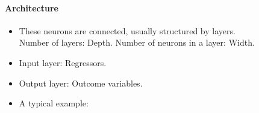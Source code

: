 \documentclass[notes, ignorenonframetext, compress, 10pt, xcolor=svgnames, aspectratio=169]{beamer}
\begin{document}
\begin{frame}{\insertsection}
  \framesubtitle{Architecture}
  \begin{itemize}
\item These neurons are connected, usually structured by layers.\\
Number of layers: Depth. Number of neurons in a layer: Width.
\item Input layer: Regressors.
\item Output layer: Outcome variables.
\item A typical example:
\begin{figure}
  \begin{center}
   \vspace{1em}
  \end{center}
\end{figure}
  \end{itemize}
\end{frame}
\end{document}
